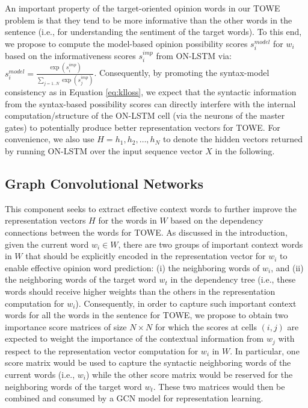\documentclass[11pt,a4paper]{article}
\begin{document}
An important property of the target-oriented opinion words in our TOWE problem is that they tend to be more informative than the other words in the sentence (i.e., for understanding the sentiment of the target words). To this end, we propose to compute the model-based opinion possibility scores $s^{model}_i$ for $w_i$ based on the informativeness scores $s^{imp}_i$ from ON-LSTM via: $s^{model}_i = \frac{\exp(s^{imp}_i)}{\sum_{j=1..N}\exp(s^{imp}_j)}$. Consequently, by promoting the syntax-model consistency as in Equation \ref{eq:klloss}, we expect that the syntactic information from the syntax-based possibility scores can directly interfere with the internal computation/structure of the ON-LSTM cell (via the neurons of the master gates) to potentially produce better representation vectors for TOWE. For convenience, we also use $H=h_1, h_2, \ldots, h_N$ to denote the hidden vectors returned by running ON-LSTM over the input sequence vector $X$ in the following.
























\subsection{Graph Convolutional Networks}
\label{sec:syntax-encoder}



This component seeks to extract effective context words to further improve the representation vectors $H$ for the words in $W$ based on the dependency connections between the words for TOWE. As discussed in the introduction, given the current word $w_i \in W$, there are two groups of important context words in $W$ that should be explicitly encoded in the representation vector for $w_i$ to enable effective opinion word prediction: (i) the neighboring words of $w_i$, and (ii) the neighboring words of the target word $w_t$ in the dependency tree (i.e., these words should receive higher weights than the others in the representation computation for $w_i$). Consequently, in order to capture such important context words for all the words in the sentence for TOWE, we propose to obtain two importance score matrices of size $N \times N$ for which the scores at cells $(i,j)$ are expected to weight the importance of the contextual information from $w_j$ with respect to the representation vector computation for $w_i$ in $W$. In particular, one score matrix would be used to capture the syntactic neighboring words of the current words (i.e., $w_i$) while the other score matrix would be reserved for the neighboring words of the target word $w_t$. These two matrices would then be combined and consumed by a GCN model \citep{kipf2017semi} for representation learning. 
\end{document}
